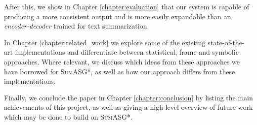 After this, we show in Chapter \ref{chapter:evaluation} that our system is capable of producing a more consistent output and is more easily expandable than an \textit{encoder-decoder} trained for text summarization.

In Chapter \ref{chapter:related_work} we explore some of the existing state-of-the-art implementations and differentiate between statistical, frame and symbolic approaches. Where relevant, we discuss which ideas from these approaches we have borrowed for \textsc{SumASG*}, as well as how our approach differs from these implementations.

Finally, we conclude the paper in Chapter \ref{chapter:conclusion} by listing the main achievements of this project, as well as giving a high-level overview of future work which may be done to build on \textsc{SumASG*}.
